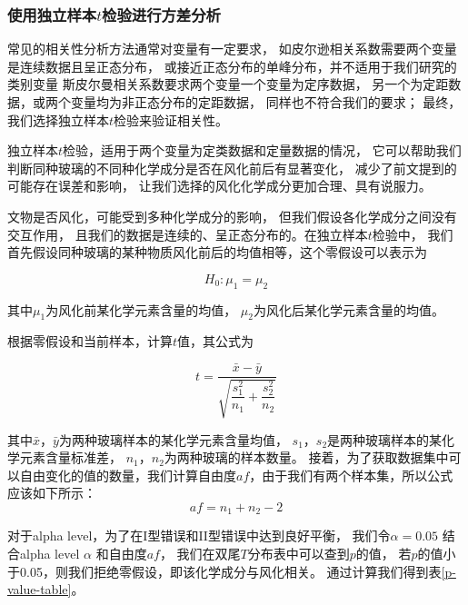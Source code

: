 \subsubsection{使用独立样本$t$检验进行方差分析}
常见的相关性分析方法通常对变量有一定要求，
如皮尔逊相关系数需要两个变量是连续数据且呈正态分布，
或接近正态分布的单峰分布，并不适用于我们研究的类别变量
斯皮尔曼相关系数要求两个变量一个变量为定序数据，
另一个为定距数据，或两个变量均为非正态分布的定距数据，
同样也不符合我们的要求；
最终，我们选择独立样本$t$检验来验证相关性。

独立样本$t$检验，适用于两个变量为定类数据和定量数据的情况，
它可以帮助我们判断同种玻璃的不同种化学成分是否在风化前后有显著变化，
减少了前文提到的可能存在误差和影响，
让我们选择的风化化学成分更加合理、具有说服力。

文物是否风化，可能受到多种化学成分的影响，
但我们假设各化学成分之间没有交互作用，
且我们的数据是连续的、呈正态分布的。在独立样本$t$检验中，
我们首先假设同种玻璃的某种物质风化前后的均值相等，这个零假设可以表示为

\begin{equation}
	H_0: \mu_{1} = \mu_{2}
\end{equation}

其中$\mu_{1}$为风化前某化学元素含量的均值，
$\mu_{2}$为风化后某化学元素含量的均值。

根据零假设和当前样本，计算$t$值，其公式为

\begin{equation}
	t = \dfrac{\bar{x} - \bar{y}}{\sqrt{\dfrac{s^2_1}{n_1} + \dfrac{s^2_2}{n_2}}}
\end{equation}

其中$\bar{x}$，$\bar{y}$为两种玻璃样本的某化学元素含量均值，
$s_1$，$s_2$是两种玻璃样本的某化学元素含量标准差，
$n_1$，$n_2$为两种玻璃的样本数量。
接着，为了获取数据集中可以自由变化的值的数量，我们计算自由度$af$，由于我们有两个样本集，所以公式应该如下所示：
\begin{equation}
	af=n_1 +n_2 - 2
\end{equation}

对于alpha level，为了在I型错误和II型错误中达到良好平衡，
我们令$\alpha=0.05$
结合alpha level $\alpha$ 和自由度$af$，
我们在双尾$T$分布表中可以查到$p$的值，
若$p$的值小于0.05，则我们拒绝零假设，即该化学成分与风化相关。
通过计算我们得到表\ref{p-value-table}。


